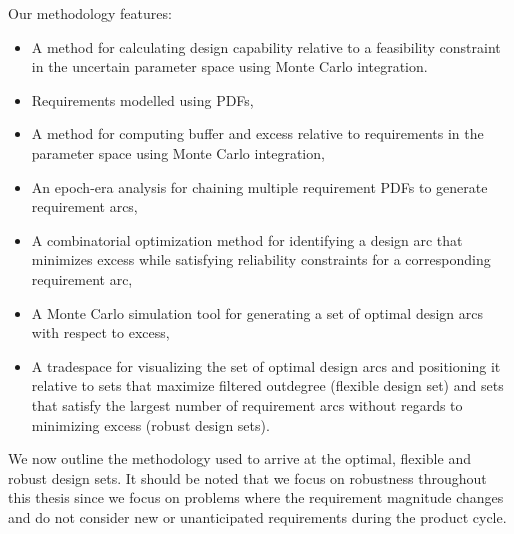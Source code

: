 Our methodology features:
\begin{itemize}
	\item A method for calculating design capability relative to a feasibility constraint in the uncertain parameter space using Monte Carlo integration.
	\item Requirements modelled using \acp{PDF},
	\item A method for computing buffer and excess relative to requirements in the parameter space using Monte Carlo integration,
	\item An epoch-era analysis for chaining multiple requirement \acp{PDF} to generate requirement arcs,
	\item A combinatorial optimization method for identifying a design arc that minimizes excess while satisfying reliability constraints for a corresponding requirement arc,
	\item A Monte Carlo simulation tool for generating a set of optimal design arcs with respect to excess,
	\item A tradespace for visualizing the set of optimal design arcs and positioning it relative to sets that maximize filtered outdegree (flexible design set) and sets that satisfy the largest number of requirement arcs without regards to minimizing excess (robust design sets).
\end{itemize}

We now outline the methodology used to arrive at the optimal, flexible and robust design sets. It should be noted that we focus on robustness throughout this thesis since we focus on problems where the requirement magnitude changes and do not consider new or unanticipated requirements during the product cycle.